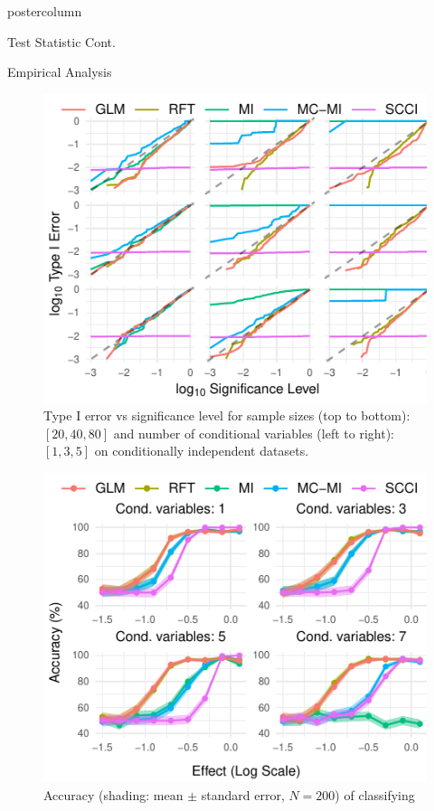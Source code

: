 \documentclass{beamer}
\begin{document}
\begin{frame}
\begin{columns}
\begin{column}{.33\textwidth}
\begin{beamercolorbox}[center]{postercolumn}
\begin{minipage}{.98\textwidth}
{\begin{myblock}{Test Statistic Cont.}
	\end{myblock}\vfill
	\begin{myblock}{Empirical Analysis}
		\begin{figure}
			\centering
			\includegraphics[scale=3]{../in_person/imgs/calibration_add_vars.pdf}
			\caption{Type I error vs significance level for sample sizes (top to
			bottom): $ [20, 40, 80] $ and number of conditional variables (left to
			right): $ [1, 3, 5] $ on conditionally independent datasets.}
			\label{fig:calibration}
		\end{figure}
		\begin{figure}
			\centering
			\includegraphics[scale=3]{../in_person/imgs/accuracy.pdf}
			\caption{Accuracy (shading: mean $\pm$ standard error, $N=200$) of classifying
}
\end{figure}
\end{myblock}}
\end{minipage}
\end{beamercolorbox}
\end{column}
\end{columns}
\end{frame}
\end{document}
